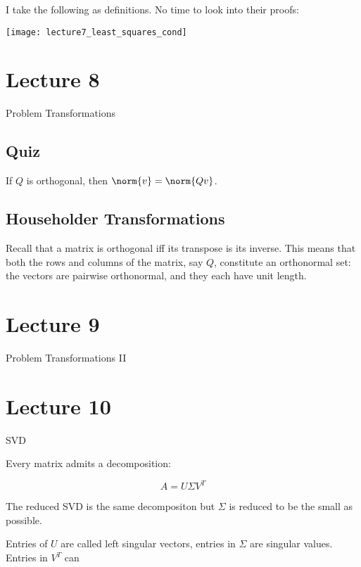 \documentclass[../main.tex]{subfiles}
\begin{document}
\begin{definition}
    I take the following as definitions. No time to look into their proofs:
    \begin{center}
        \texttt{[image: lecture7\_least\_squares\_cond]}
    \end{center}
\end{definition}


\section{Lecture 8}{Problem Transformations}

\subsection{Quiz}
\begin{remark}
    If $Q$ is orthogonal, then $\norm{v} = \norm{Qv}$.
\end{remark}

\subsection{Householder Transformations}


\begin{remark}
    Recall that a matrix is orthogonal iff its transpose is its inverse.
    This means that both the rows and columns of the matrix, say $Q$, constitute an orthonormal set: the vectors are pairwise orthonormal, and they each have unit length.
\end{remark}
\begin{definition}
    
\end{definition}

\section{Lecture 9}{Problem Transformations II}

\section{Lecture 10}{SVD}

\begin{definition}
    Every matrix admits a decomposition:

    \[
        A = U \Sigma V^T
    \]

    The reduced SVD is the same decompositon but $\Sigma$ is reduced
    to be the small as possible.

    Entries of $U$ are called left singular vectors, entries in $\Sigma$ are singular values. Entries in $V^T$ can
\end{definition}
\end{document}
